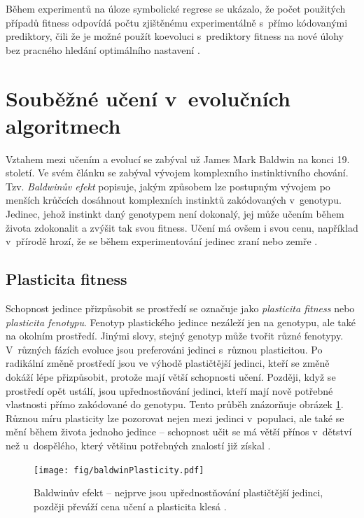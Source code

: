 Během experimentů na úloze symbolické regrese se ukázalo, že počet použitých případů fitness odpovídá počtu zjištěnému experimentálně s~přímo kódovanými prediktory, čili že je možné použít koevoluci s~prediktory fitness na nové úlohy bez pracného hledání optimálního nastavení \cite{Siku2015}.


\section{Souběžné učení v~evolučních algoritmech}

Vztahem mezi učením a evolucí se zabýval už James Mark Baldwin na konci 19. století. Ve svém článku \cite{Baldwin} se zabýval vývojem komplexního instinktivního chování. Tzv. \emph{Baldwinův efekt} popisuje, jakým způsobem lze postupným vývojem po menších krůčcích dosáhnout komplexních instinktů zakódovaných v~genotypu. Jedinec, jehož instinkt daný genotypem není dokonalý, jej může učením během života zdokonalit a zvýšit tak svou fitness. Učení má ovšem i svou cenu, například v~přírodě hrozí, že se během experimentování jedinec zraní nebo zemře \cite{HowToShiftBias}.

\subsection{Plasticita fitness}

Schopnost jedince přizpůsobit se prostředí se označuje jako \emph{plasticita fitness} nebo \emph{plasticita fenotypu}. Fenotyp plastického jedince nezáleží jen na genotypu, ale také na okolním prostředí. Jinými slovy, stejný genotyp může tvořit různé fenotypy. V~různých fázích evoluce jsou preferováni jedinci s~různou plasticitou. Po radikální změně prostředí jsou ve výhodě plastičtější jedinci, kteří se změně dokáží lépe přizpůsobit, protože mají větší schopnosti učení. Později, když se prostředí opět ustálí, jsou upřednostňování jedinci, kteří mají nově potřebné vlastnosti přímo zakódované do genotypu. Tento průběh znázorňuje obrázek \ref{obrBaldwin}. Různou míru plasticity lze pozorovat nejen mezi jedinci v~populaci, ale také se mění během života jednoho jedince -- schopnost učit se má větší přínos v~dětství než u~dospělého, který většinu potřebných znalostí již získal \cite{EllefsenBalancing}.

\begin{figure}[htb]
    \centering\texttt{[image: fig/baldwinPlasticity.pdf]}
    \caption{Baldwinův efekt -- nejprve jsou upřednostňování plastičtější jedinci, později převáží cena učení a plasticita klesá \cite{EllefsenBalancing}.}
    \label{obrBaldwin}
\end{figure}

